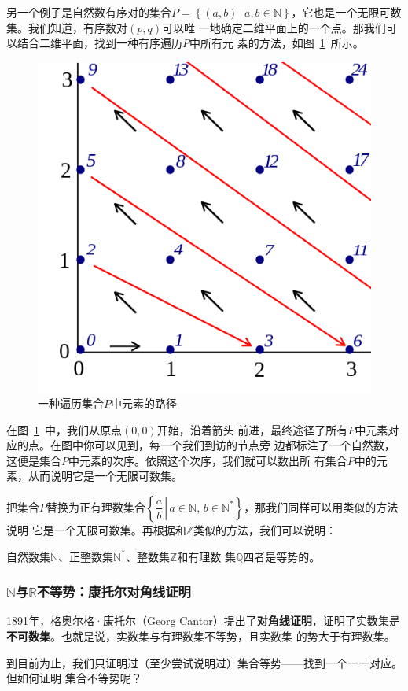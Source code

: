 另一个例子是自然数有序对的集合$P=\left\{ \left( a,b \right) \,|\, a,b\in\mathbb{N} 
\right\} $，它也是一个无限可数集。我们知道，有序数对$\left( p,q \right) $可以唯
一地确定二维平面上的一个点。那我们可以结合二维平面，找到一种有序遍历$P$中所有元
素的方法，如图~\ref{fig:pairing_natural}~所示。

\begin{figure}[H]
    \centering
    \includegraphics[width=0.4\linewidth]{fig/pairing_natural.png}
    \caption{一种遍历集合$P$中元素的路径}\label{fig:pairing_natural}
\end{figure}

在图~\ref{fig:pairing_natural}~中，我们从原点$\left( 0,0 \right) $开始，沿着箭头
前进，最终途径了所有$P$中元素对应的点。在图中你可以见到，每一个我们到访的节点旁
边都标注了一个自然数，这便是集合$P$中元素的次序。依照这个次序，我们就可以数出所
有集合$P$中的元素，从而说明它是一个无限可数集。

把集合$P$替换为正有理数集合$\left\{\left. \dfrac{a}{b}\,\right|\, a\in 
\mathbb{N},\,b\in\mathbb{N}^\ast \right\} $，那我们同样可以用类似的方法说明
它是一个无限可数集。再根据和$\mathbb{Z}$类似的方法，我们可以说明：

\begin{rawthm}
    自然数集$\mathbb{N}$、正整数集$\mathbb{N}^\ast$、整数集$\mathbb{Z}$和有理数
    集$\mathbb{Q}$四者是等势的。
\end{rawthm}

\subsubsection{$\mathbb{N}$与$\mathbb{R}$不等势：康托尔对角线证明}

1891年，格奥尔格·康托尔（Georg Cantor）提出了\textbf{对角线证明}，证明了实数集是\textbf{不可数集}。也就是说，实数集与有理数集不等势，且实数集
的势大于有理数集。

到目前为止，我们只证明过（至少尝试说明过）集合等势——找到一个一一对应。但如何证明
集合不等势呢？

